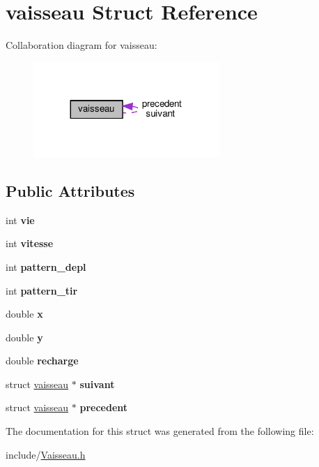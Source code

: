 \hypertarget{structvaisseau}{}\section{vaisseau Struct Reference}
\label{structvaisseau}


Collaboration diagram for vaisseau\+:
\nopagebreak
\begin{figure}[H]
\begin{center}
\leavevmode
\includegraphics[width=200pt]{structvaisseau__coll__graph}
\end{center}
\end{figure}
\subsection*{Public Attributes}
\begin{DoxyCompactItemize}
\item 
\mbox{\label{structvaisseau_a0cb94bb0c837dcc208baabca829e230d}} 
int {\bfseries vie}
\item 
\mbox{\label{structvaisseau_a60422b77d6a17d09cca6cfd0fb46805f}} 
int {\bfseries vitesse}
\item 
\mbox{\label{structvaisseau_a1d5c23a174802c7f76b14f5ed3099611}} 
int {\bfseries pattern\+\_\+depl}
\item 
\mbox{\label{structvaisseau_a54167f88ef33c7ed0e1cc2b22c48e326}} 
int {\bfseries pattern\+\_\+tir}
\item 
\mbox{\label{structvaisseau_a37a774eecae4fe0b26374ffc7dfd7620}} 
double {\bfseries x}
\item 
\mbox{\label{structvaisseau_a0ea56ebcbc55ad3c8c3f82f86c845de8}} 
double {\bfseries y}
\item 
\mbox{\label{structvaisseau_ad7b2012b4c501941858233c02ac64eeb}} 
double {\bfseries recharge}
\item 
\mbox{\label{structvaisseau_ae3902cbd0c2d0657c3af1e2c3ebc026b}} 
struct \hyperlink{structvaisseau}{vaisseau} $\ast$ {\bfseries suivant}
\item 
\mbox{\label{structvaisseau_a6e062ba9a923cb9d29252087053bad13}} 
struct \hyperlink{structvaisseau}{vaisseau} $\ast$ {\bfseries precedent}
\end{DoxyCompactItemize}


The documentation for this struct was generated from the following file\+:\begin{DoxyCompactItemize}
\item 
include/\hyperlink{_vaisseau_8h}{Vaisseau.\+h}\end{DoxyCompactItemize}
